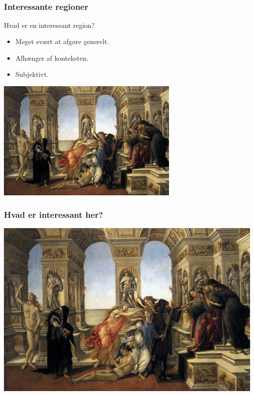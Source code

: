 \documentclass[xcolor=table]{beamer}
\begin{document}
\subsection*{}
\begin{frame}

    \frametitle{Interessante regioner}

    \begin{block}{Hvad er en interessant region?}
        \begin{itemize}
            \item Meget svært at afgøre generelt.
            \item Afhænger af konteksten.
            \item Subjektivt.
        \end{itemize}
    \end{block}

    \begin{center}
        \includegraphics[width=0.67\textwidth]{billeder/10calumn.jpg}
    \end{center}

\end{frame}

\begin{frame}

    \frametitle{Hvad er interessant her?}

    \begin{center}
        \includegraphics[width=1.00\textwidth]{billeder/10calumn.jpg}
    \end{center}

\end{frame}
\end{document}
